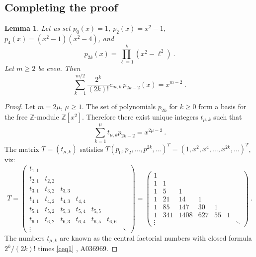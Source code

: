 \documentclass[10pt]{amsart}
\newcommand{\ZZ}{{\mathbb Z}}
\theoremstyle{plain}
\newtheorem{lem}[thm]{Lemma}
\newcommand{\0}{\color{blue}{\mathsf{0}}}
\begin{document}
\subsection{Completing the proof}
\begin{lem} Let us set  $p_0(x)=1$, $p_2(x)= x^2-1$, $p_4(x)=(x^2-1)(x^2-4)$, and 
\[ p_{2k}(x) =\prod^{k}_{\ell=1} (x^2-\ell^2) \ . \]
Let $m\geq2$ be even. Then 
\begin{equation} \label{psasxs} \sum_{k=1}^{m/2}  \frac{2^k}{(2k)!} c_{m,k}\, p_{2k-2}(x) = x^{m-2} \ .\end{equation}
\end{lem}
\begin{proof}
Let $m=2\mu$, $\mu\geq1$. The set of  polynomials $p_{2k}$ for $k\geq 0$ form a basis for the free $\ZZ$-module  $\ZZ[x^2]$.  Therefore there exist unique integers $t_{\mu,k}$ such that 
    \[  \sum_{k=1}^{\mu}  t_{\mu,k} p_{2k-2} = x^{2\mu-2}\ .   \]
The matrix $T=(t_{\mu,k})$ satisfies  $T (p_0,p_2,\ldots,p^{2k},\ldots )^T = (1,x^2,x^4,\ldots , x^{2k},\ldots)^T $, viz: 
    \[ T=  \begin{pmatrix} t_{1,1}  &   & &  &\\ t_{2,1} & t_{2,2} &  & &&   \\ t_{3,1} & t_{3,2} & t_{3,3}  & &&  \\   t_{4,1} & t_{4,2} & t_{4,3} & t_{4,4}  & &\\ 
    t_{5,1} &   t_{5,2} & t_{5,3} &  t_{5,4} &   t_{5,5} &\\
    t_{6,1} &   t_{6,2} &  t_{6,3} &  t_{6,4} &  t_{6,5} &  t_{6,6}  \\
    \vdots & & & & & &  \ddots  
    \end{pmatrix}  = \begin{pmatrix} 1  & & & &  &\\ 1& 1 &  & &&   \\ 1& 5 & 1  & &&  \\   1 & 21 & 14 & 1  & &\\ 
    1 &   85 & 147 &  30 &   1 &\\
    1 &   341 &  1408 &  627 &  55 &  1 \\
      \vdots & & & & & &  \ddots  
    \end{pmatrix}\ . \]
The numbers $t_{\mu,k}$ are known as the central factorial numbers with closed formula $2^k/(2k)!$ times \eqref{ceq1}
\cite{Sloane}, A036969.
\end{proof}
\end{document}

